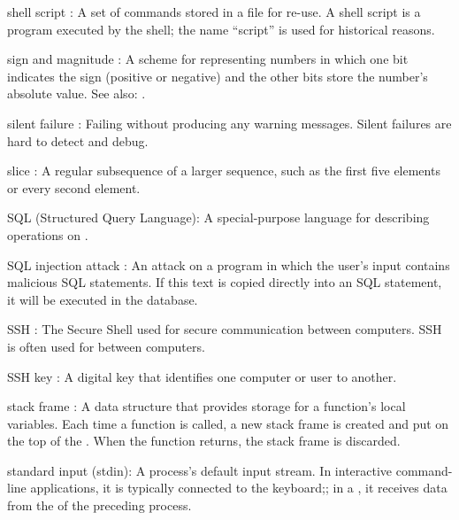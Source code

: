 \documentclass{book}
\begin{document}
\begin{swcdescription}
\item[shell script]:
A set of  commands
stored in a file for re-use. A shell script is a program executed by the
shell; the name ``script'' is used for historical reasons.
 
\item[sign and magnitude]:
A scheme for representing numbers in which one bit indicates the sign (positive or negative)
and the other bits store the number's absolute value.
See also: .

\item[silent failure]:
Failing without producing any warning messages.
Silent failures are hard to detect and debug.

\item[slice]:
A regular subsequence of a larger sequence, such as the
first five elements or every second element.

\item[SQL] (Structured Query Language):
A special-purpose language for
describing operations on .

\item[SQL injection attack]:
An attack on a program in which the
user's input contains malicious SQL statements. If this text is copied
directly into an SQL statement, it will be executed in the database.

\item[SSH]:
The Secure Shell  used for secure communication between computers.
SSH is often used for  between computers.

\item[SSH key]:
A digital key that identifies one computer or user to another.

\item[stack frame]:
A data structure that provides storage for a
function's local variables. Each time a function is called, a new stack
frame is created and put on the top of the . When the function returns, the stack frame is discarded.

\item[standard input] (stdin):
A process's default input stream. In
interactive command-line applications, it is typically connected to the
keyboard;; in a , it receives data from the
 of the preceding process.


\end{swcdescription}
\end{document}
